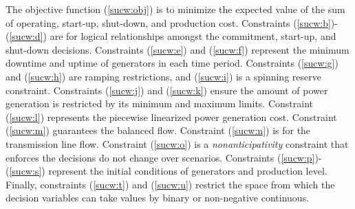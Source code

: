 The objective function (\ref{sucw:obj}) is to minimize the expected value of the sum of operating, start-up, shut-down, and production cost. Constraints (\ref{sucw:b})-(\ref{sucw:d}) are for logical relationships amongst the commitment, start-up, and shut-down decisions. Constraints (\ref{sucw:e}) and (\ref{sucw:f}) represent the minimum downtime and uptime of generators in each time period. Constraints (\ref{sucw:g}) and (\ref{sucw:h}) are ramping restrictions, and (\ref{sucw:i}) is a spinning reserve constraint. Constraints (\ref{sucw:j}) and (\ref{sucw:k}) ensure the amount of power generation is restricted by its minimum and maximum limits. Constraint (\ref{sucw:l}) represents the piecewise linearized power generation cost. Constraint (\ref{sucw:m}) guarantees the balanced flow. Constraint (\ref{sucw:n}) is for the transmission line flow. Constraint (\ref{sucw:o}) is a \textit{nonanticipativity} constraint that enforces the decisions do not change over scenarios. Constraints (\ref{sucw:p})-(\ref{sucw:s}) represent the initial conditions of generators and production level. Finally, constraints (\ref{sucw:t}) and (\ref{sucw:u}) restrict the space from which the decision variables can take values by binary or non-negative continuous. 


